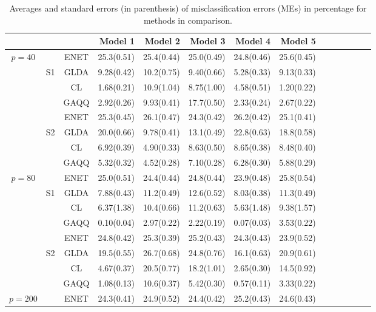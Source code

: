 \documentclass[12pt]{article}
\begin{document}
\begin{table}
\begin{center}
\caption{Averages and standard errors (in parenthesis) of misclassification errors (MEs) in percentage for methods in comparison.}
\label{table:me}
\begin{tabular}{cccrrrrrrrrrrr}
\hline \hline
\multicolumn{3}{c}{}&Model 1&Model 2&Model 3&Model 4&Model 5\\
\hline
\multirow{8}{*}{$p=40$}
&  &ENET&25.3(0.51) &25.4(0.44) &25.0(0.49) &24.8(0.46) &25.6(0.45) \\
&S1&GLDA&9.28(0.42) &10.2(0.75) &9.40(0.66) &5.28(0.33) &9.13(0.33) \\
&  &CL  &1.68(0.21) &10.9(1.04) &8.75(1.00) &4.58(0.51) &1.20(0.22) \\
&  &GAQQ&2.92(0.26) &9.93(0.41) &17.7(0.50) &2.33(0.24) &2.67(0.22) \\
\hhline{~---------}
&  &ENET&25.3(0.45) &26.1(0.47) &24.3(0.42) &26.2(0.42) &25.1(0.41) \\
&S2&GLDA&20.0(0.66) &9.78(0.41) &13.1(0.49) &22.8(0.63) &18.8(0.58)\\
&  &CL  &6.92(0.39) &4.90(0.33) &8.63(0.50) &8.65(0.38) &8.48(0.40) \\
&  &GAQQ&5.32(0.32) &4.52(0.28) &7.10(0.28) &6.28(0.30) &5.88(0.29) \\
\hline
\multirow{8}{*}{$p=80$}
&  &ENET&25.0(0.51) &24.4(0.44) &24.8(0.44) &23.9(0.48) &25.8(0.54) \\
&S1&GLDA&7.88(0.43) &11.2(0.49) &12.6(0.52) &8.03(0.38) &11.3(0.49) \\
&  &CL  &6.37(1.38) &10.4(0.66) &11.2(0.63) &5.63(1.48) &9.38(1.57) \\
&  &GAQQ&0.10(0.04) &2.97(0.22) &2.22(0.19) &0.07(0.03) &3.53(0.22) \\
\hhline{~---------}
&  &ENET&24.8(0.42) &25.3(0.39) &25.2(0.43) &24.3(0.43) &23.9(0.52) \\
&S2&GLDA&19.5(0.55) &26.7(0.68) &24.8(0.76) &16.1(0.63) &20.9(0.61) \\
&  &CL  &4.67(0.37) &20.5(0.77) &18.2(1.01) &2.65(0.30) &14.5(0.92) \\
&  &GAQQ&1.08(0.13) &10.6(0.37) &5.42(0.30) &0.57(0.11) &3.33(0.22) \\
\hline
\multirow{8}{*}{$p=200$}
&  &ENET&24.3(0.41) &24.9(0.52) &24.4(0.42) &25.2(0.43) &24.6(0.43) \\

\end{tabular}
\end{center}
\end{table}
\end{document}

